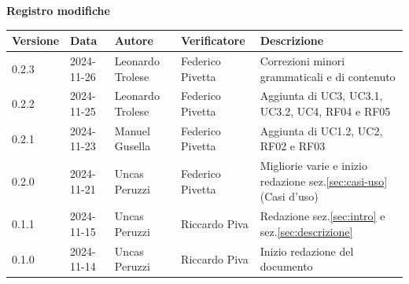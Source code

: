 \documentclass[11pt]{article}
\begin{document}
\centering\textbf{Registro modifiche}\\
\vspace{2mm}
\begin{tabularx}{\textwidth}{|l|l|l|l|X|}
\hline
\textbf{Versione} & \textbf{Data} & \textbf{Autore} & \textbf{Verificatore} & \textbf{Descrizione} \\
\hline
0.2.3 & 2024-11-26 & Leonardo Trolese  & Federico Pivetta & Correzioni minori grammaticali e di contenuto \\
\hline
0.2.2 & 2024-11-25 & Leonardo Trolese  & Federico Pivetta & Aggiunta di UC3, UC3.1, UC3.2, UC4, RF04 e RF05 \\
\hline
0.2.1 & 2024-11-23 & Manuel Gusella  & Federico Pivetta & Aggiunta di UC1.2, UC2, RF02 e RF03 \\
\hline
0.2.0 & 2024-11-21 & Uncas Peruzzi  & Federico Pivetta & Migliorie varie e inizio redazione sez.\ref{sec:casi-uso} (Casi d'uso) \\
\hline
0.1.1 & 2024-11-15 & Uncas Peruzzi  & Riccardo Piva & Redazione sez.\ref{sec:intro} e sez.\ref{sec:descrizione} \\
\hline
0.1.0 & 2024-11-14 & Uncas Peruzzi  & Riccardo Piva & Inizio redazione del documento\\
\hline
\end{tabularx}
\newpage
\tableofcontents
\listoffigures %
\end{document}
